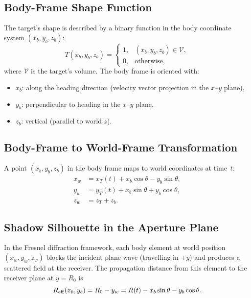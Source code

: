 \documentclass[11pt,a4paper]{article}
\begin{document}
\subsection{Body-Frame Shape Function}

The target's shape is described by a binary function in the body
coordinate system $(x_b,y_b,z_b)$:
\begin{equation}
  T(x_b,y_b,z_b) =
  \begin{cases}
    1, & (x_b,y_b,z_b)\in\mathcal{V},\\
    0, & \text{otherwise},
  \end{cases}
  \label{eq:body_shape}
\end{equation}
where $\mathcal{V}$ is the target's volume.  The body frame is
oriented with:
\begin{itemize}
  \item $x_b$: along the heading direction (velocity vector
    projection in the $x$--$y$ plane),
  \item $y_b$: perpendicular to heading in the $x$--$y$ plane,
  \item $z_b$: vertical (parallel to world $z$).
\end{itemize}

\subsection{Body-Frame to World-Frame Transformation}

A point $(x_b,y_b,z_b)$ in the body frame maps to world
coordinates at time~$t$:
\begin{align}
  x_w &= x_T(t) + x_b\cos\theta - y_b\sin\theta,
  \label{eq:xw}\\
  y_w &= y_T(t) + x_b\sin\theta + y_b\cos\theta,
  \label{eq:yw}\\
  z_w &= z_T + z_b.
  \label{eq:zw}
\end{align}

\subsection{Shadow Silhouette in the Aperture Plane}
\label{sec:shadow_silhouette}

In the Fresnel diffraction framework, each body element at world
position $(x_w,y_w,z_w)$ blocks the incident plane wave (travelling
in $+y$) and produces a scattered field at the receiver.  The
propagation distance from this element to the receiver plane at
$y=R_0$ is
\begin{equation}
  R_{\rm eff}(x_b,y_b) = R_0 - y_w
  = R(t) - x_b\sin\theta - y_b\cos\theta.
  \label{eq:R_eff_general}
\end{equation}
\end{document}
